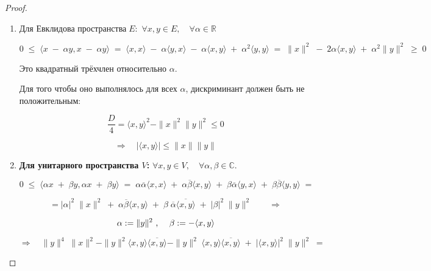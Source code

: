 \documentclass[12px]{report}
\begin{document}
\vspace{0.2cm}
\begin{proof}



    \begin{enumerate}
        \item 
        
        $\textbf{Для Евклидова пространства} \; E:$ \; $\forall x, y \in E, \quad \forall \alpha \in \mathbb{R}$
        
        $$0 \; \leq \; \langle x \; - \; \alpha y, x \; - \; \alpha y \rangle \; = \; \langle x, x \rangle \; - \; \alpha \langle y, x \rangle \; - \; \alpha \langle x, y \rangle \; + \; \alpha^2 \langle y, y \rangle \; = \; \|x\|^2 \; - \; 2 \alpha \langle x, y \rangle \; + \; \alpha^2 \|y\|^2 \; \geq \; 0$$
        
        Это квадратный трёхчлен относительно \( \alpha \). 
        
        Для того чтобы оно выполнялось для всех \( \alpha \), дискриминант должен быть не положительным:
        
        $$\frac{D}{4} = \langle x, y \rangle^2 - \|x\|^2 \|y\|^2 \leq 0$$
        
        
        $$\Longrightarrow \quad |\langle x, y \rangle| \leq \|x\| \|y\|$$
        
    \item \textbf{Для унитарного пространства \( V \):} \quad $\forall x, y \in V, \quad \forall \alpha, \beta \in \mathbb{C}$.
        
        $$0 \; \leq \; \langle \alpha x \; + \; \beta y, \alpha x \; + \; \beta y \rangle \; = \; \alpha \overline{\alpha} \langle x, x \rangle \; + \; \alpha \overline{\beta} \langle x, y \rangle \; + \; \beta \overline{\alpha} \langle y, x \rangle \; + \; \beta \overline{\beta} \langle y, y \rangle \; =$$
        
        $$= |\alpha|^2 \; \|x\|^2 \; + \; \alpha \overline{\beta} \langle x, y \rangle \; + \; \beta \; \overline{\alpha} \overline{\langle x, y \rangle } \; + \; |\beta|^2 \; \|y\|^2 \qquad \Longrightarrow$$
        
        $$\alpha := \|y\|^2 \) , \quad \( \beta := -\langle x, y \rangle$$
 
        $$\Longrightarrow \quad \|y\|^4 \; \|x\|^2 - \|y\|^2 \langle x, y \rangle \overline{\langle x, y \rangle} - \|y\|^2 \; \langle x, y \rangle \overline{\langle x, y \rangle} \; + \; |\langle x, y \rangle |^2 \; \|y\|^2 \; =$$
        

\end{enumerate}
\end{proof}
\end{document}
